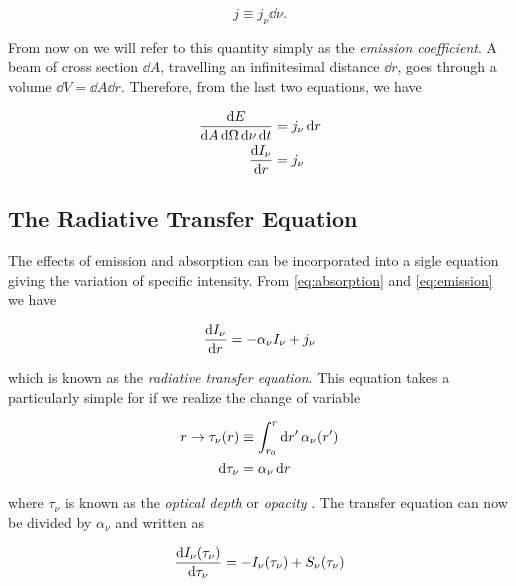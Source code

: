 \begin{equation}
        j \equiv j_\nu \dd{\nu}.
\end{equation}

From now on we will refer to this quantity simply as the \emph{emission
coefficient}.
A beam of cross section $\dd{A}$, travelling an infinitesimal distance
$\dd{r}$, goes through a volume $\dd{V} = \dd{A} \dd{r}$. Therefore, from
the last two equations, we have

\begin{equation}
        \begin{split}
        \frac{\dd{E}}{\dd{A}\dd{\Omega}\dd{\nu}\dd{t}} & = j_\nu \dd{r} \\
        \dv{I_\nu}{r} & = j_\nu
        \label{eq:emission}
        \end{split}
\end{equation}

\subsection{The Radiative Transfer Equation}\label{ss:radiative_transfer_eq}

The effects of emission and absorption can be incorporated into a sigle
equation giving the variation of specific intensity. From \autoref{eq:absorption}
and \autoref{eq:emission} we have

\begin{equation}
        \dv{I_\nu}{r} = -\alpha_\nu I_\nu + j_\nu
\end{equation}

which is known as the \emph{radiative transfer equation}. This equation
takes a particularly simple for if we realize the change of variable

\begin{equation}
        \begin{split}
                r \rightarrow \tau_\nu\qty(r) & \equiv \int^r_{r_0}
                \dd{r'}\alpha_\nu\qty(r') \\
                \dd{\tau_\nu} & = \alpha_\nu \dd{r}
        \end{split}
\end{equation}

where $\tau_\nu$ is known as the \emph{optical depth} or \emph{opacity}
\autocite{rybicki2008radiative}.
The transfer equation can now be divided by $\alpha_\nu$ and written as

\begin{equation}
        \dv{I_\nu\qty(\tau_\nu)}{\tau_\nu} = -I_\nu(\tau_\nu) +
        S_\nu\qty(\tau_\nu)
        \label{eq:radiative_transfer}
\end{equation}


